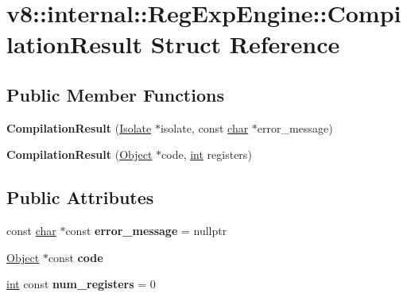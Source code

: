 \hypertarget{structv8_1_1internal_1_1RegExpEngine_1_1CompilationResult}{}\section{v8\+:\+:internal\+:\+:Reg\+Exp\+Engine\+:\+:Compilation\+Result Struct Reference}
\label{structv8_1_1internal_1_1RegExpEngine_1_1CompilationResult}
\subsection*{Public Member Functions}
\begin{DoxyCompactItemize}
\item 
\mbox{\label{structv8_1_1internal_1_1RegExpEngine_1_1CompilationResult_ae09fb0e61981b463c8e0bd3dc7e0d7a0}} 
{\bfseries Compilation\+Result} (\mbox{\hyperlink{classv8_1_1internal_1_1Isolate}{Isolate}} $\ast$isolate, const \mbox{\hyperlink{classchar}{char}} $\ast$error\+\_\+message)
\item 
\mbox{\label{structv8_1_1internal_1_1RegExpEngine_1_1CompilationResult_add8747981b5647a04f2fec660508c893}} 
{\bfseries Compilation\+Result} (\mbox{\hyperlink{classv8_1_1internal_1_1Object}{Object}} $\ast$code, \mbox{\hyperlink{classint}{int}} registers)
\end{DoxyCompactItemize}
\subsection*{Public Attributes}
\begin{DoxyCompactItemize}
\item 
\mbox{\label{structv8_1_1internal_1_1RegExpEngine_1_1CompilationResult_a04fcdd63e239cfcddc019dc243dfd21c}} 
const \mbox{\hyperlink{classchar}{char}} $\ast$const {\bfseries error\+\_\+message} = nullptr
\item 
\mbox{\label{structv8_1_1internal_1_1RegExpEngine_1_1CompilationResult_a74bf6c878c1cdd49ced61853d748c861}} 
\mbox{\hyperlink{classv8_1_1internal_1_1Object}{Object}} $\ast$const {\bfseries code}
\item 
\mbox{\label{structv8_1_1internal_1_1RegExpEngine_1_1CompilationResult_a7c094af9cff99ffdf34d6f03626530db}} 
\mbox{\hyperlink{classint}{int}} const {\bfseries num\+\_\+registers} = 0
\end{DoxyCompactItemize}


